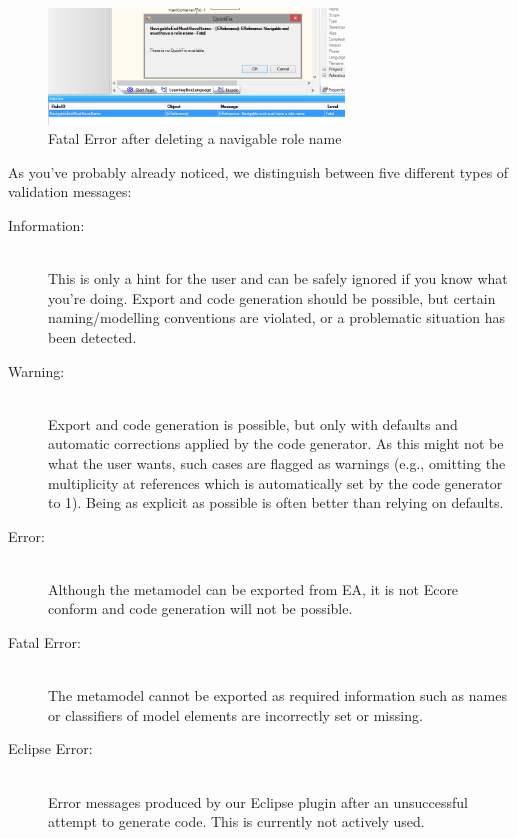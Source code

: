 \begin{enumerate}
\begin{figure}[htbp]
	\centering
  \includegraphics[width=0.7\textwidth]{pics/memBoxBilder/memBox47}
	\caption{Fatal Error after deleting a navigable role name}
	\label{fig:fatal-error}
\end{figure}
\end{enumerate}

As you've probably already noticed, we distinguish between five different types of validation messages:
\begin{description}
  \item[Information:]~\\
  This is only a hint for the user and can be safely ignored if you know what you're doing.
  Export and code generation should be possible, but certain naming/modelling conventions are violated, or a problematic situation has been detected.
  \item[Warning:]~\\ Export and code generation is possible, but only with defaults and automatic corrections applied by the code generator.
  As this might not be what the user wants, such cases are flagged as warnings (e.g., omitting the multiplicity at references which is automatically set by the code generator to 1).
  Being as explicit as possible is often better than relying on defaults.
  \item[Error:]~\\ Although the metamodel can be exported from EA, it is not Ecore conform and code generation will not be possible.
  \item[Fatal Error:]~\\ The metamodel cannot be exported as required information such as names or classifiers of model elements are incorrectly set or missing.
  \item[Eclipse Error:]~\\ Error messages produced by our Eclipse plugin after an unsuccessful attempt to generate code.
  This is currently not actively used.

\end{description}

